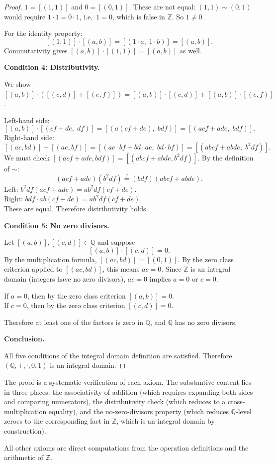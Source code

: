 \begin{proof}
$1 = [(1,1)]$ and $0 = [(0,1)]$. These are not equal: $(1,1)\sim(0,1)$
would require $1\cdot 1 = 0\cdot 1$, i.e.\ $1 = 0$, which is false in
$\mathbb{Z}$. So $1\neq 0$.

For the identity property:
\[
[(1,1)]\cdot[(a,b)]
= [(1\cdot a,\; 1\cdot b)]
= [(a,b)].
\]
Commutativity gives $[(a,b)]\cdot[(1,1)] = [(a,b)]$ as well.

\textbf{Condition 4: Distributivity.}

We show $[(a,b)]\cdot([(c,d)]+[(e,f)]) = [(a,b)]\cdot[(c,d)] + [(a,b)]\cdot[(e,f)]$.

Left-hand side:
\[
[(a,b)]\cdot[(cf+de,\;df)]
= [(a(cf+de),\;bdf)]
= [(acf+ade,\;bdf)].
\]
Right-hand side:
\[
[(ac,bd)] + [(ae,bf)]
= [(ac\cdot bf + bd\cdot ae,\; bd\cdot bf)]
= [(abcf+abde,\; b^2df)].
\]
We must check $[(acf+ade,bdf)] = [(abcf+abde,b^2df)]$.
By the definition of $\sim$:
\[
(acf+ade)(b^2df) \stackrel{?}{=} (bdf)(abcf+abde).
\]
Left: $b^2df(acf+ade) = ab^2df(cf+de)$.\\
Right: $bdf\cdot ab(cf+de) = ab^2df(cf+de)$.\\
These are equal. Therefore distributivity holds.

\textbf{Condition 5: No zero divisors.}

Let $[(a,b)],[(c,d)]\in\mathbb{Q}$ and suppose
\[
[(a,b)]\cdot[(c,d)] = 0.
\]
By the multiplication formula, $[(ac,bd)] = [(0,1)]$.
By the zero class criterion applied to $[(ac,bd)]$, this means $ac = 0$.
Since $\mathbb{Z}$ is an integral domain (integers have no zero divisors),
$ac = 0$ implies $a = 0$ or $c = 0$.

If $a = 0$, then by the zero class criterion $[(a,b)] = 0$.\\
If $c = 0$, then by the zero class criterion $[(c,d)] = 0$.

Therefore at least one of the factors is zero in $\mathbb{Q}$, and $\mathbb{Q}$
has no zero divisors.

\textbf{Conclusion.}

All five conditions of the integral domain definition are satisfied.
Therefore $(\mathbb{Q},+,\cdot,0,1)$ is an integral domain.
\end{proof}

\begin{remark*}
The proof is a systematic verification of each axiom. The substantive
content lies in three places: the associativity of addition (which requires
expanding both sides and comparing numerators), the distributivity check
(which reduces to a cross-multiplication equality), and the no-zero-divisors
property (which reduces $\mathbb{Q}$-level zeroes to the corresponding fact
in $\mathbb{Z}$, which is an integral domain by construction).

All other axioms are direct computations from the operation definitions and
the arithmetic of $\mathbb{Z}$.
\end{remark*}

